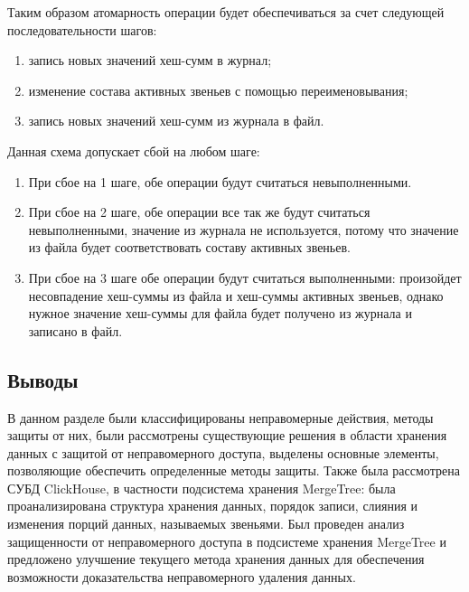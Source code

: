 Таким образом атомарность операции будет обеспечиваться за счет следующей последовательности шагов:
\begin{enumerate}
	\item запись новых значений хеш-сумм в журнал;
	\item изменение состава активных звеньев с помощью переименовывания;
	\item запись новых значений хеш-сумм из журнала в файл.
\end{enumerate}

Данная схема допускает сбой на любом шаге:
\begin{enumerate}
	\item При сбое на 1 шаге, обе операции будут считаться невыполненными.
	\item При сбое на 2 шаге, обе операции все так же будут считаться невыполненными, значение из журнала не используется, потому что значение из файла будет соответствовать составу активных звеньев.
	\item При сбое на 3 шаге обе операции будут считаться выполненными: произойдет несовпадение хеш-суммы из файла и хеш-суммы активных звеньев, однако нужное значение хеш-суммы для файла будет получено из журнала и записано в файл.
\end{enumerate}

\subsection{Выводы}

В данном разделе были классифицированы неправомерные действия, методы защиты от них, были рассмотрены существующие решения в области хранения данных с защитой от неправомерного доступа, выделены основные элементы, позволяющие обеспечить определенные методы защиты. Также была рассмотрена СУБД ClickHouse, в частности подсистема хранения MergeTree: была проанализирована структура хранения данных, порядок записи, слияния и изменения порций данных, называемых звеньями. Был проведен анализ защищенности от неправомерного доступа в подсистеме хранения MergeTree и предложено улучшение текущего метода хранения данных для обеспечения возможности доказательства неправомерного удаления данных.

\pagebreak